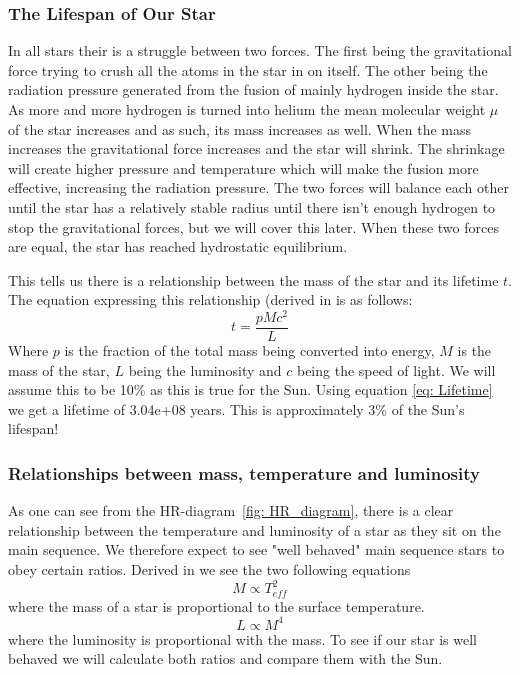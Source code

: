 \documentclass[reprint,english,notitlepage]{revtex4-2}
\begin{document}
\subsubsection*{The Lifespan of Our Star}
In all stars their is a struggle between two forces. The first being the gravitational force trying to crush all the atoms in the star in on itself. The other being the radiation pressure generated from the fusion of mainly hydrogen inside the star. As more and more hydrogen is turned into helium the mean molecular weight $ μ $ of the star increases and as such, its mass increases as well. When the mass increases the gravitational force increases and the star will shrink. The shrinkage will create higher pressure and temperature which will make the fusion more effective, increasing the radiation pressure. The two forces will balance each other until the star has a relatively stable radius until there isn't enough hydrogen to stop the gravitational forces, but we will cover this later. When these two forces are equal, the star has reached hydrostatic equilibrium. 

This tells us there is a relationship between the mass of the star and its lifetime $ t $. The equation expressing this relationship (derived in %
is as follows:
\begin{equation} \label{eq: Lifetime}
  t = \frac{pMc^{2}}{L}
\end{equation}
Where $ p $ is the fraction of the total mass being converted into energy, $ M $ is the mass of the star, $ L $ being the luminosity and $ c $ being the speed of light. We will assume this to be 10\% as this is true for the Sun. Using equation \ref{eq: Lifetime} we get a lifetime of 3.04e+08 years. This is approximately 3\% of the Sun's lifespan!

\subsubsection*{Relationships between mass, temperature and luminosity}
As one can see from the HR-diagram~\ref{fig: HR_diagram}, there is a clear relationship between the temperature and luminosity of a star as they sit on the main sequence.
We therefore expect to see "well behaved" main sequence stars to obey certain ratios.
Derived in%
we see the two following equations
\begin{equation}\label{eq: T M ratio}
  M ∝ T^{2}_{eff}
\end{equation}
where the mass of a star is proportional to the surface temperature. 
\begin{equation}\label{eq: M L ratio}
  L ∝ M^{4}
\end{equation}
where the luminosity is proportional with the mass. To see if our star is well behaved we will calculate both ratios and compare them with the Sun. 
\end{document}
